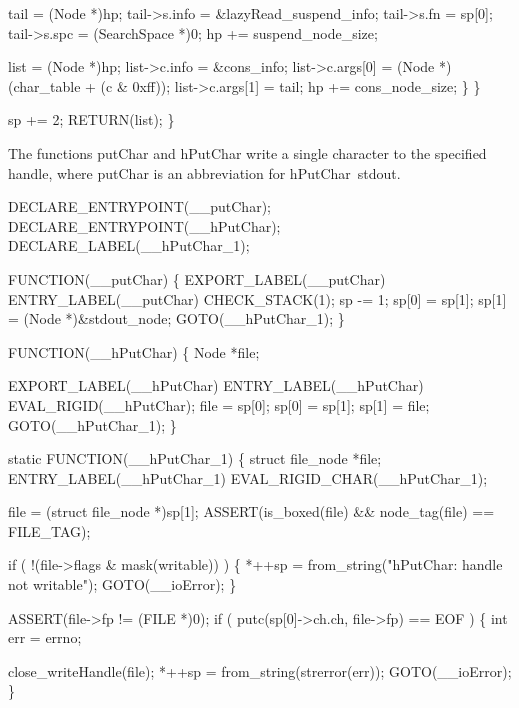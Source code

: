             tail         = (Node *)hp;
            tail->s.info = &lazyRead_suspend_info;
            tail->s.fn   = sp[0];
            tail->s.spc  = (SearchSpace *)0;
            hp          += suspend_node_size;

            list            = (Node *)hp;
            list->c.info    = &cons_info;
            list->c.args[0] = (Node *)(char_table + (c & 0xff));
            list->c.args[1] = tail;
            hp             += cons_node_size;
        \}
    \}

    sp += 2;
    RETURN(list);
\}

\nwendcode{}\nwdocspar
The functions {\Tt{}putChar\nwendquote} and {\Tt{}hPutChar\nwendquote} write a single character to
the specified handle, where {\Tt{}putChar\nwendquote} is an abbreviation for
{\Tt{}hPutChar\ stdout\nwendquote}.

\nwenddocs{}\plusendmoddef\nwstartdeflinemarkup{}\nwenddeflinemarkup
DECLARE_ENTRYPOINT(__putChar);
DECLARE_ENTRYPOINT(__hPutChar);
DECLARE_LABEL(__hPutChar_1);

FUNCTION(__putChar)
\{
    EXPORT_LABEL(__putChar)
 ENTRY_LABEL(__putChar)
    CHECK_STACK(1);
    sp   -= 1;
    sp[0] = sp[1];
    sp[1] = (Node *)&stdout_node;
    GOTO(__hPutChar_1);
\}

FUNCTION(__hPutChar)
\{
    Node *file;

    EXPORT_LABEL(__hPutChar)
 ENTRY_LABEL(__hPutChar)
    EVAL_RIGID(__hPutChar);
    file  = sp[0];
    sp[0] = sp[1];
    sp[1] = file;
    GOTO(__hPutChar_1);
\}

static
FUNCTION(__hPutChar_1)
\{
    struct file_node *file;
 ENTRY_LABEL(__hPutChar_1)
    EVAL_RIGID_CHAR(__hPutChar_1);

    file = (struct file_node *)sp[1];
    ASSERT(is_boxed(file) && node_tag(file) == FILE_TAG);

    if ( !(file->flags & mask(writable)) )
    \{
        *++sp = from_string("hPutChar: handle not writable");
        GOTO(__ioError);
    \}

    ASSERT(file->fp != (FILE *)0);
    if ( putc(sp[0]->ch.ch, file->fp) == EOF )
    \{
        int err = errno;

        close_writeHandle(file);
        *++sp = from_string(strerror(err));
        GOTO(__ioError);
    \}


